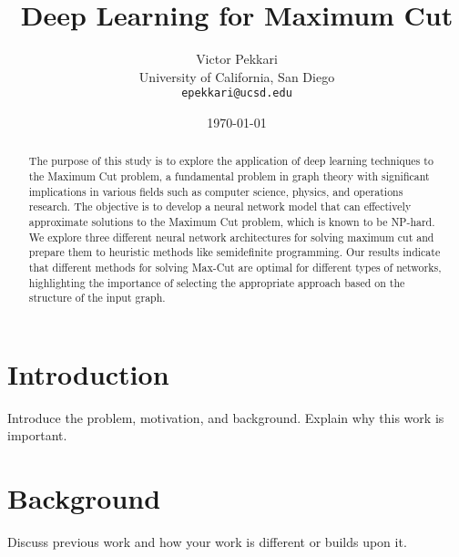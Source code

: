 \documentclass[11pt,a4paper]{article}
\title{Deep Learning for Maximum Cut}
\author{Victor Pekkari \\ \small{University of California, San Diego} \\ \small{\texttt{epekkari@ucsd.edu}}}
\date{\today}
\begin{document}
\maketitle

\begin{abstract}




The purpose of this study is to explore the application of deep learning techniques to the Maximum Cut problem, a fundamental problem in graph theory with significant implications in various fields such as computer science, physics, and operations research. The objective is to develop a neural network model that can effectively approximate solutions to the Maximum Cut problem, which is known to be NP-hard.
We explore three different neural network architectures for solving maximum cut and prepare them to heuristic methods like semidefinite programming. 
Our results indicate that different methods for solving Max-Cut are optimal for different types of networks, highlighting the importance of selecting the appropriate approach based on the structure of the input graph.
\end{abstract}

\section{Introduction}
Introduce the problem, motivation, and background. Explain why this work is important.

\section{Background}
Discuss previous work and how your work is different or builds upon it.

\end{document}
